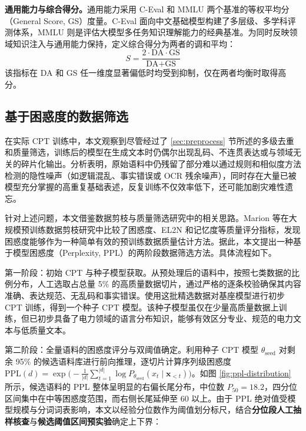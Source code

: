\documentclass[fontset=fandol,type=master,campus=shenzhen,etitleauto=true]{hithesisbook}
\begin{document}
\textbf{通用能力与综合得分。}通用能力采用 C-Eval 和 MMLU 两个基准的等权平均分（General Score, GS）度量。C-Eval 面向中文基础模型构建了多层级、多学科评测体系\cite{ref66}，MMLU 则是评估大模型多任务知识理解能力的经典基准\cite{ref67}。为同时反映领域知识注入与通用能力保持，定义综合得分为两者的调和平均：
\begin{equation}
S = \frac{2 \cdot \text{DA} \cdot \text{GS}}{\text{DA} + \text{GS}}
\end{equation}
该指标在 DA 和 GS 任一维度显著偏低时均受到抑制，仅在两者均衡时取得高分。

\subsection{基于困惑度的数据筛选}\label{ux57faux4e8eux56f0ux60d1ux5ea6ux7684ux6570ux636eux7b5bux9009}

在实际 CPT 训练中，本文观察到尽管经过了 \ref{sec:preprocess} 节所述的多级去重和质量筛选，训练后的模型在生成文本时仍偶尔出现乱码、不连贯表达或与领域无关的碎片化输出。分析表明，原始语料中仍残留了部分难以通过规则和相似度方法检测的隐性噪声（如逻辑混乱、事实错误或 OCR 残余噪声），同时存在大量已被模型充分掌握的高重复基础表述，反复训练不仅效率低下，还可能加剧灾难性遗忘。

针对上述问题，本文借鉴数据剪枝与质量筛选研究中的相关思路。Marion 等在大规模预训练数据剪枝研究中比较了困惑度、EL2N 和记忆度等质量评分指标，发现困惑度能够作为一种简单有效的预训练数据质量估计方法\cite{ref58}。据此，本文提出一种基于模型困惑度（Perplexity, PPL）的两阶段数据筛选方法。具体流程如下。

第一阶段：初始 CPT 与种子模型获取。从预处理后的语料中，按照七类数据的比例分布，人工选取占总量 5\% 的高质量数据切片，通过严格的逐条校验确保其内容准确、表达规范、无乱码和事实错误。使用这批精选数据对基座模型进行初步 CPT 训练，得到一个种子 CPT 模型。该种子模型虽仅在少量高质量数据上训练，但已初步具备了电力领域的语言分布知识，能够有效区分专业、规范的电力文本与低质量文本。

第二阶段：全量语料的困惑度评分与双阈值确定。利用种子 CPT 模型 $\theta_{\text{seed}}$ 对剩余 95\% 的候选语料库进行前向推理，逐切片计算序列级困惑度 $\text{PPL}(d) = \exp\bigl(-\frac{1}{|d|}\sum_{t=1}^{|d|} \log P_{\theta_{\text{seed}}}(x_t \mid \mathbf{x}_{<t})\bigr)$。如图 \ref{fig:ppl-distribution} 所示，候选语料的 PPL 整体呈明显的右偏长尾分布，中位数 $P_{50} = 18.2$，四分位区间集中在中等困惑度范围，而右侧长尾延伸至 $60$ 以上。由于 PPL 绝对值受模型规模与分词词表影响，本文以经验分位数作为阈值划分标尺，结合\textbf{分位段人工抽样核查}与\textbf{候选阈值区间预实验}确定上下界：
\end{document}
